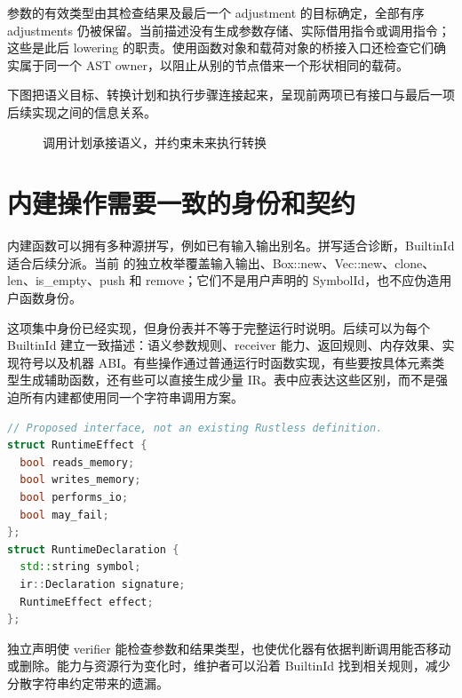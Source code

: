 参数的有效类型由其检查结果及最后一个 adjustment 的目标确定，全部有序 adjustments 仍被保留。当前描述没有生成参数存储、实际借用指令或调用指令；这些是此后 lowering 的职责。使用函数对象和载荷对象的桥接入口还检查它们确实属于同一个 AST owner，以阻止从别的节点借来一个形状相同的载荷。

下图把语义目标、转换计划和执行步骤连接起来，呈现前两项已有接口与最后一项后续实现之间的信息关系。
\begin{figure}[htbp]\centering
{}
\caption{调用计划承接语义，并约束未来执行转换}
\end{figure}

\section{内建操作需要一致的身份和契约}
内建函数可以拥有多种源拼写，例如已有输入输出别名。拼写适合诊断，BuiltinId 适合后续分派。当前  的独立枚举覆盖输入输出、Box::new、Vec::new、clone、len、is\_empty、push 和 remove；它们不是用户声明的 SymbolId，也不应伪造用户函数身份。

这项集中身份已经实现，但身份表并不等于完整运行时说明。后续可以为每个 BuiltinId 建立一致描述：语义参数规则、receiver 能力、返回规则、内存效果、实现符号以及机器 ABI。有些操作通过普通运行时函数实现，有些要按具体元素类型生成辅助函数，还有些可以直接生成少量 IR。表中应表达这些区别，而不是强迫所有内建都使用同一个字符串调用方案。

\begin{lstlisting}[language=C++,caption={教学建议：将运行时效果作为明确契约}]
// Proposed interface, not an existing Rustless definition.
struct RuntimeEffect {
  bool reads_memory;
  bool writes_memory;
  bool performs_io;
  bool may_fail;
};
struct RuntimeDeclaration {
  std::string symbol;
  ir::Declaration signature;
  RuntimeEffect effect;
};
\end{lstlisting}
独立声明使 verifier 能检查参数和结果类型，也使优化器有依据判断调用能否移动或删除。能力与资源行为变化时，维护者可以沿着 BuiltinId 找到相关规则，减少分散字符串约定带来的遗漏。

